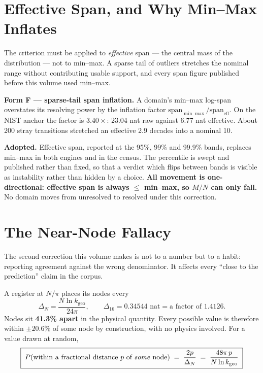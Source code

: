 \documentclass[11pt, letterpaper, openany]{book}
\newcommand{\kgeo}{k_{\mathrm{geo}}}
\newcommand{\MN}{M/N}
\begin{document}
\section{Effective Span, and Why Min--Max Inflates}

The criterion must be applied to \emph{effective} span --- the central mass of the distribution ---
not to min--max. A sparse tail of outliers stretches the nominal range without contributing usable
support, and every span figure published before this volume used min--max.

\begin{formbox}
\textbf{Form F --- sparse-tail span inflation.} A domain's min--max log-span overstates its
resolving power by the inflation factor $\text{span}_{\min\max} / \text{span}_{\text{eff}}$. On the
NIST anchor the factor is $\mathbf{3.40\times}$: 23.04 nat raw against 6.77 nat effective. About 200
stray transitions stretched an effective 2.9 decades into a nominal 10.

\medskip
\textbf{Adopted.} Effective span, reported at the 95\%, 99\% and 99.9\% bands, replaces min--max in
both engines and in the census. The percentile is swept and published rather than fixed, so that a
verdict which flips between bands is visible as instability rather than hidden by a choice.
\textbf{All movement is one-directional: effective span is always $\leq$ min--max, so $\MN$ can only
fall.} No domain moves from unresolved to resolved under this correction.
\end{formbox}

\section{The Near-Node Fallacy}
\label{sec:nearnode}

The second correction this volume makes is not to a number but to a habit: reporting agreement
against the wrong denominator. It affects every ``close to the prediction'' claim in the corpus.

A register at $N/\pi$ places its nodes every
\[
\Delta_N = \frac{N \ln \kgeo}{24\pi}, \qquad
\Delta_{16} = 0.34544 \text{ nat} = \text{a factor of } 1.4126 .
\]
Nodes sit \textbf{41.3\% apart} in the physical quantity. Every possible value is therefore within
$\pm 20.6\%$ of some node by construction, with no physics involved. For a value drawn at random,
\[
\boxed{\;P(\text{within a fractional distance } p \text{ of \emph{some} node})
\;=\; \frac{2p}{\Delta_N} \;=\; \frac{48\pi\,p}{N \ln \kgeo}\;}
\]
\end{document}
